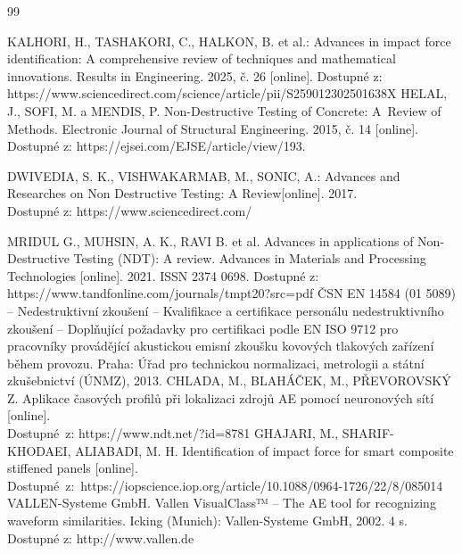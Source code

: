 

\begin{thebibliography}{99}

    KALHORI, H., TASHAKORI, C., HALKON, B. et al.: 
    Advances in impact force identification: A comprehensive review of
techniques and mathematical innovations. Results in Engineering. 2025, č. 26 [online]. Dostupné z: https://www.sciencedirect.com/science/article/pii/S259012302501638X
    HELAL, J., SOFI, M. a MENDIS, P. Non-Destructive Testing of Concrete: A~Review of Methods. Electronic Journal of Structural Engineering. 2015, č. 14 [online]. Dostupné z: https://ejsei.com/EJSE/article/view/193.

DWIVEDIA, S. K., VISHWAKARMAB, M., SONIC, A.: 
Advances and Researches on Non Destructive Testing: A Review[online]. 2017. \\Dostupné z: https://www.sciencedirect.com/
 
MRIDUL G., MUHSIN, A. K., RAVI B. et al. Advances in applications of Non-Destructive
Testing (NDT): A review. Advances in
Materials and Processing Technologies [online]. 2021. ISSN 2374 0698. Dostupné z: https://www.tandfonline.com/journals/tmpt20?src=pdf
ČSN EN 14584 (01 5089) – Nedestruktivní zkoušení – Kvalifikace a certifikace personálu nedestruktivního zkoušení – Doplňující požadavky pro certifikaci podle EN ISO 9712 pro pracovníky provádějící akustickou emisní zkoušku kovových tlakových zařízení během provozu.
Praha: Úřad pro technickou normalizaci, metrologii a státní zkušebnictví (ÚNMZ), 2013.
CHLADA, M., BLAHÁČEK, M., PŘEVOROVSKÝ Z. Aplikace časových profilů při lokalizaci zdrojů AE pomocí neuronových sítí [online]. \\Dostupné~z: https://www.ndt.net/?id=8781
GHAJARI, M., SHARIF-KHODAEI, ALIABADI, M. H. Identification of impact force for smart composite stiffened panels [online]. Dostupné~z:~https://iopscience.iop.org/article/10.1088/0964-1726/22/8/085014
VALLEN-Systeme GmbH. Vallen VisualClass™ – The AE tool for recognizing waveform similarities. Icking (Munich): Vallen-Systeme GmbH, 2002. 4 s.\\ Dostupné z: http://www.vallen.de


\end{thebibliography}
